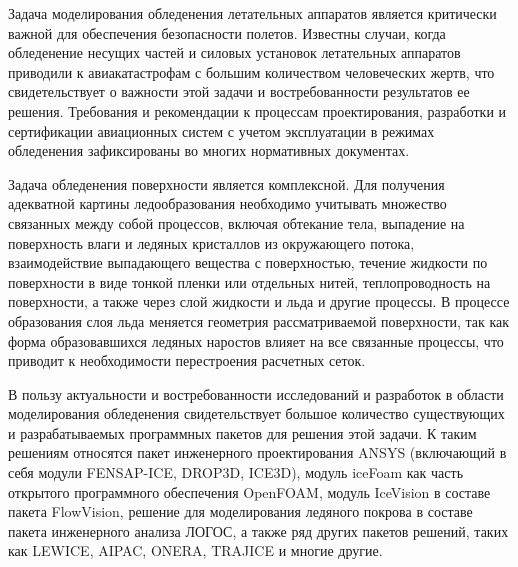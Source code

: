 \documentclass[a4paper,14pt]{extarticle}                     %
\theoremstyle{plain}                                         %
\begin{document}
Задача моделирования обледенения летательных аппаратов является критически важной для обеспечения безопасности полетов.
Известны случаи, когда обледенение несущих частей и силовых установок летательных аппаратов приводили к авиакатастрофам с большим количеством человеческих жертв,
что свидетельствует о важности этой задачи и востребованности результатов ее решения.
Требования и рекомендации к процессам проектирования, разработки и сертификации авиационных систем с учетом эксплуатации в режимах обледенения зафиксированы во многих нормативных документах.

Задача обледенения поверхности является комплексной.
Для получения адекватной картины ледообразования необходимо учитывать множество связанных между собой процессов, включая обтекание тела, выпадение на поверхность влаги и ледяных кристаллов из окружающего потока, взаимодействие выпадающего вещества с поверхностью, течение жидкости по поверхности в виде тонкой пленки или отдельных нитей, теплопроводность на поверхности, а также через слой жидкости и льда и другие процессы.
В процессе образования слоя льда меняется геометрия рассматриваемой поверхности, так как форма образовавшихся ледяных наростов влияет на все связанные процессы, что приводит к необходимости перестроения расчетных сеток.

В пользу актуальности и востребованности исследований и разработок в области моделирования обледенения свидетельствует большое количество существующих и разрабатываемых программных пакетов для решения этой задачи.
К таким решениям относятся пакет инженерного проектирования ANSYS (включающий в себя модули FENSAP-ICE, DROP3D, ICE3D), модуль iceFoam как часть открытого программного обеспечения OpenFOAM, модуль IceVision в составе пакета FlowVision, решение для моделирования ледяного покрова в составе пакета инженерного анализа ЛОГОС, а также ряд других пакетов решений, таких как LEWICE, AIPAC, ONERA, TRAJICE и многие другие.
\end{document}
